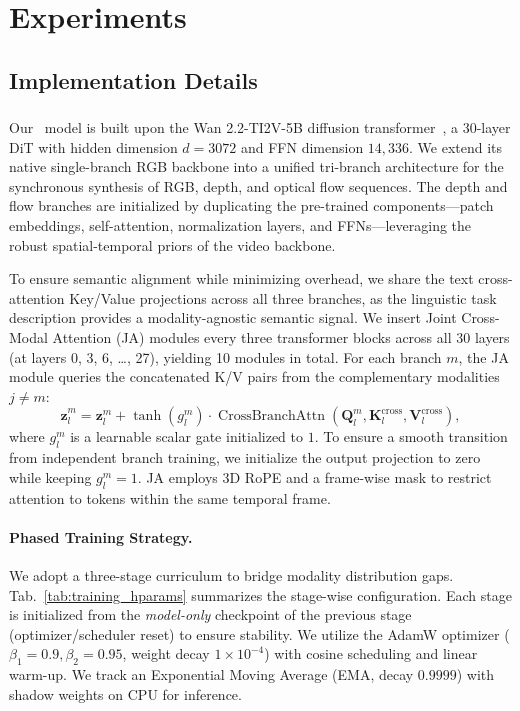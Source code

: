 
\section{Experiments}
\subsection{Implementation Details}
\label{sec:implementation}

\subsubsection{\our}
Our \our\ model is built upon the Wan 2.2-TI2V-5B diffusion transformer~\citep{wang2025wan}, a 30-layer DiT with hidden dimension $d=3072$ and FFN dimension $14{,}336$. We extend its native single-branch RGB backbone into a unified tri-branch architecture for the synchronous synthesis of RGB, depth, and optical flow sequences. The depth and flow branches are initialized by duplicating the pre-trained components—patch embeddings, self-attention, normalization layers, and FFNs—leveraging the robust spatial-temporal priors of the video backbone. 

To ensure semantic alignment while minimizing overhead, we share the text cross-attention Key/Value projections across all three branches, as the linguistic task description provides a modality-agnostic semantic signal. We insert Joint Cross-Modal Attention (JA) modules every three transformer blocks across all 30 layers (at layers 0, 3, 6, \dots, 27), yielding 10 modules in total. For each branch $m$, the JA module queries the concatenated K/V pairs from the complementary modalities $j \neq m$:
\begin{equation}
    \hat{\bm{z}}_l^m = \bm{z}_l^m + \tanh(g_l^m) \cdot \operatorname{CrossBranchAttn}(\bm{Q}_l^m, \bm{K}_l^{\text{cross}}, \bm{V}_l^{\text{cross}}),
\end{equation}
where $g_l^m$ is a learnable scalar gate initialized to $1$. To ensure a smooth transition from independent branch training, we initialize the output projection to zero while keeping $g_l^m=1$. JA employs 3D RoPE and a frame-wise mask to restrict attention to tokens within the same temporal frame.

\paragraph{Phased Training Strategy.}
We adopt a three-stage curriculum to bridge modality distribution gaps. Tab.~\ref{tab:training_hparams} summarizes the stage-wise configuration. Each stage is initialized from the \emph{model-only} checkpoint of the previous stage (optimizer/scheduler reset) to ensure stability. We utilize the AdamW optimizer ($\beta_1{=}0.9, \beta_2{=}0.95$, weight decay $1{\times}10^{-4}$) with cosine scheduling and linear warm-up. We track an Exponential Moving Average (EMA, decay $0.9999$) with shadow weights on CPU for inference.

